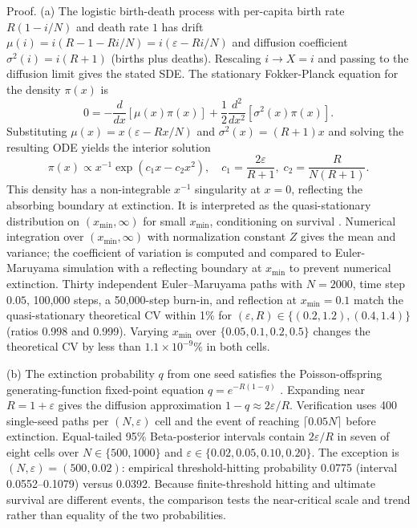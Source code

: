 \documentclass[review]{elsarticle}
\theoremstyle{plain}
\theoremstyle{definition}
\begin{document}
Proof. (a) The logistic birth-death process with per-capita birth rate $R(1 - i/N)$ and death rate $1$ has drift $\mu(i) = i(R - 1 - Ri/N) = i(\varepsilon - Ri/N)$ and diffusion coefficient $\sigma^2(i) = i(R + 1)$ (births plus deaths). Rescaling $i \to X = i$ and passing to the diffusion limit gives the stated SDE. The stationary Fokker-Planck equation for the density $\pi(x)$ is
\begin{equation}
0 = -\frac{d}{dx}\left[\mu(x)\pi(x)\right] + \frac{1}{2}\frac{d^2}{dx^2}\left[\sigma^2(x)\pi(x)\right].
\end{equation}
Substituting $\mu(x) = x(\varepsilon - Rx/N)$ and $\sigma^2(x) = (R+1)x$ and solving the resulting ODE yields the interior solution
\begin{equation}
\pi(x) \propto x^{-1} \exp\left(c_1 x - c_2 x^2\right), \quad c_1 = \frac{2\varepsilon}{R+1}, \; c_2 = \frac{R}{N(R+1)}.
\end{equation}
This density has a non-integrable $x^{-1}$ singularity at $x=0$, reflecting the absorbing boundary at extinction. It is interpreted as the quasi-stationary distribution on $(x_{\min}, \infty)$ for small $x_{\min}$, conditioning on survival \citep{nassel2001extinction}. Numerical integration over $(x_{\min}, \infty)$ with normalization constant $Z$ gives the mean and variance; the coefficient of variation is computed and compared to Euler-Maruyama simulation with a reflecting boundary at $x_{\min}$ to prevent numerical extinction. Thirty independent Euler--Maruyama paths with $N=2000$, time step $0.05$, 100,000 steps, a 50,000-step burn-in, and reflection at $x_{\min}=0.1$ match the quasi-stationary theoretical CV within 1\% for $(\varepsilon,R)\in\{(0.2,1.2),(0.4,1.4)\}$ (ratios 0.998 and 0.999). Varying $x_{\min}$ over $\{0.05,0.1,0.2,0.5\}$ changes the theoretical CV by less than $1.1\times10^{-9}\%$ in both cells.

(b) The extinction probability $q$ from one seed satisfies the Poisson-offspring generating-function fixed-point equation $q = e^{-R(1-q)}$ \citep{harris1963branching}. Expanding near $R=1+\varepsilon$ gives the diffusion approximation $1-q\approx2\varepsilon/R$. Verification uses 400 single-seed paths per $(N,\varepsilon)$ cell and the event of reaching $\lceil0.05N\rceil$ before extinction. Equal-tailed 95\% Beta-posterior intervals contain $2\varepsilon/R$ in seven of eight cells over $N\in\{500,1000\}$ and $\varepsilon\in\{0.02,0.05,0.10,0.20\}$. The exception is $(N,\varepsilon)=(500,0.02)$: empirical threshold-hitting probability 0.0775 (interval 0.0552--0.1079) versus 0.0392. Because finite-threshold hitting and ultimate survival are different events, the comparison tests the near-critical scale and trend rather than equality of the two probabilities.
\end{document}
